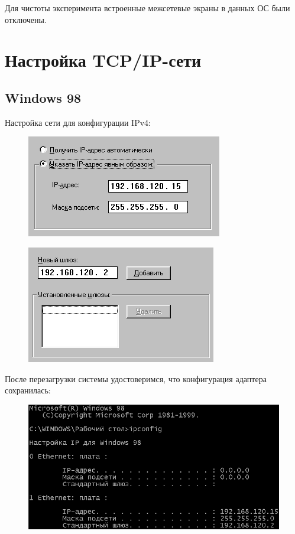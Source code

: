 \documentclass[14pt,a4paper,report]{report}
\begin{document}
Для чистоты эксперимента встроенные межсетевые экраны в данных ОС были отключены.

\clearpage

\section{Настройка TCP/IP-сети}

\subsection{Windows 98}

Настройка сети для конфигурации IPv4:

\begin{figure}[h!]
	\centering
	\includegraphics[scale = 0.7]{images/2_1.png}
	\caption{}
	\label{image:4}
\end{figure}

\begin{figure}[h!]
	\centering
	\includegraphics[scale = 0.7]{images/2_2.png}
	\caption{}
	\label{image:5}
\end{figure}

После перезагрузки системы удостоверимся, что конфигурация адаптера сохранилась:

\begin{figure}[h!]
	\centering
	\includegraphics[scale = 0.8]{images/2_3.png}
	\caption{}
	\label{image:6}
\end{figure}
\end{document}
